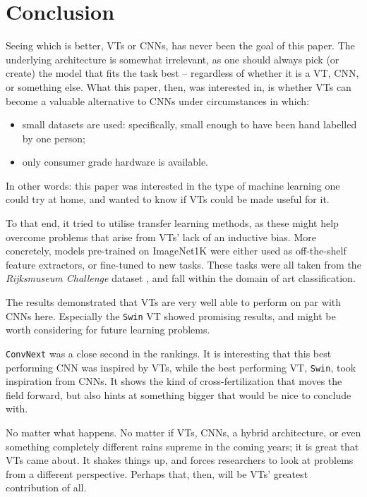 \section{Conclusion}
Seeing which is better, VTs or CNNs, has never been the goal of this paper. The underlying architecture is somewhat irrelevant, as one should always pick (or create) the model that fits the task best -- regardless of whether it is a VT, CNN, or something else. What this paper, then, was interested in, is whether VTs can become a valuable alternative to CNNs under circumstances in which:
\begin{itemize}
\item small datasets are used: specifically, small enough to have been hand labelled by one person;
\item only consumer grade hardware is available.
\end{itemize}
In other words: this paper was interested in the type of machine learning one could try at home, and wanted to know if VTs could be made useful for it.

To that end, it tried to utilise transfer learning methods, as these might help overcome problems that arise from VTs' lack of an inductive bias. More concretely, models pre-trained on ImageNet1K were either used as off-the-shelf feature extractors, or fine-tuned to new tasks. These tasks were all taken from the \textit{Rijksmuseum Challenge} dataset \citep{mensink14icmr}, and fall within the domain of art classification.

The results demonstrated that VTs are very well able to perform on par with CNNs here. Especially the \texttt{Swin} VT showed promising results, and might be worth considering for future learning problems.

\texttt{ConvNext} was a close second in the rankings. It is interesting that this best performing CNN was inspired by VTs, while the best performing VT, \texttt{Swin}, took inspiration from CNNs. It shows the kind of cross-fertilization that moves the field forward, but also hints at something bigger that would be nice to conclude with.

No matter what happens. No matter if VTs, CNNs, a hybrid architecture, or even something completely different rains supreme in the coming years; it is great that VTs came about. It shakes things up, and forces researchers to look at problems from a different perspective. Perhaps that, then, will be VTs' greatest contribution of all.
